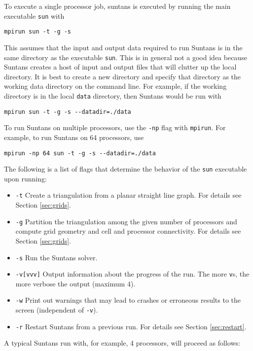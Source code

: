 \documentclass[12pt,oneside]{article}
\begin{document}
To execute a single processor job, suntans is executed by running the main executable \verb+sun+ with
\begin{verbatim}
mpirun sun -t -g -s 
\end{verbatim}
This assumes that the input and output data required to run Suntans is in the same directory
as the executable \verb+sun+.  This is in general not a good idea because Suntans creates a host
of input and output files that will clutter up the local directory.  It is best to create a new
directory and specify that directory as the working data directory on the command line.  For
example, if the working directory is in the local \verb+data+ directory, then Suntans would be
run with
\begin{verbatim}
mpirun sun -t -g -s --datadir=./data
\end{verbatim}
To run Suntans on multiple processors, use the \verb+-np+ flag with \verb+mpirun+. For example,
to run Suntans on 64 processors, use
\begin{verbatim}
mpirun -np 64 sun -t -g -s --datadir=./data
\end{verbatim}
The following is a list of flags that determine the behavior of the \verb+sun+ executable upon
running:
\begin{itemize}
\item{\verb+-t+} Create a triangulation from a planar straight line graph.  For details see
Section \ref{sec:grids}.
\item{\verb+-g+} Partition the triangulation among the given number of processors and
compute grid geometry and cell and processor connectivity.  For details see Section \ref{sec:grids}.
\item{\verb+-s+} Run the Suntans solver.
\item{\verb+-v[vvv]+} Output information about the progress of the run.  The more \verb+v+s, the
more verbose the output (maximum 4).
\item{\verb+-w+} Print out warnings that may lead to crashes or erroneous results to the screen
(independent of \verb+-v+).
\item{\verb+-r+} Restart Suntans from a previous run.  For details see Section \ref{sec:restart}.
\end{itemize}
A typical Suntans run with, for example, 4 processors, will proceed as follows:
\end{document}
